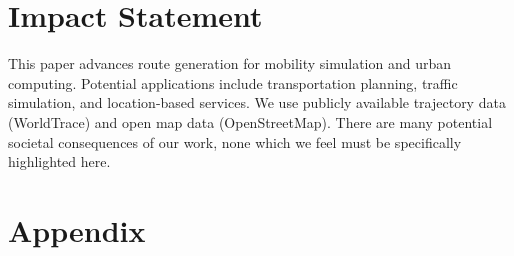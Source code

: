 \documentclass{article}
\theoremstyle{plain}
\theoremstyle{definition}
\theoremstyle{remark}
\begin{document}
\section*{Impact Statement}

This paper advances route generation for mobility simulation and urban computing.
Potential applications include transportation planning, traffic simulation, and location-based services.
We use publicly available trajectory data (WorldTrace) and open map data (OpenStreetMap).
There are many potential societal consequences of our work, none which we feel must be specifically highlighted here.




\newpage
\appendix
\onecolumn
\section{Appendix}

\end{document}
